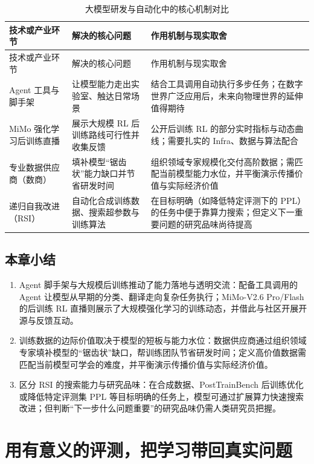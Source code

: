 \documentclass[UTF8,a4paper,11pt,fontset=fandol]{ctexart}
\begin{document}
\begin{longtable}{>{\raggedright\arraybackslash}p{\dimexpr(\linewidth-6\tabcolsep)/3\relax}>{\raggedright\arraybackslash}p{\dimexpr(\linewidth-6\tabcolsep)/3\relax}>{\raggedright\arraybackslash}p{\dimexpr(\linewidth-6\tabcolsep)/3\relax}}
\caption{大模型研发与自动化中的核心机制对比}\\
\toprule
技术或产业环节 & 解决的核心问题 & 作用机制与现实取舍\\\midrule
\endfirsthead
\toprule
技术或产业环节 & 解决的核心问题 & 作用机制与现实取舍\\\midrule
\endhead
Agent 工具与脚手架 & 让模型能力走出实验室、触达日常场景 & 结合工具调用自动执行多步任务；在数字世界广泛应用后，未来向物理世界的延伸值得期待\\[4pt]
MiMo 强化学习后训练直播 & 展示大规模 RL 后训练路线可行性并收集反馈 & 公开后训练 RL 的部分实时指标与动态曲线；需要扎实的 Infra、数据与算法配合\\[4pt]
专业数据供应商（数商） & 填补模型“锯齿状”能力缺口并节省研发时间 & 组织领域专家规模化交付高阶数据；需匹配当前模型能力水位，并平衡演示传播价值与实际经济价值\\[4pt]
递归自我改进（RSI） & 自动化合成训练数据、搜索超参数与训练算法 & 在目标明确（如降低特定评测下的 PPL）的任务中便于靠算力搜索；但定义下一重要问题的研究品味尚待提高\\[4pt]
\bottomrule\end{longtable}\endgroup
{}\subsection{本章小结}
\begin{enumerate}
\item Agent 脚手架与大规模后训练推动了能力落地与透明交流：配备工具调用的 Agent 让模型从早期的分类、翻译走向复杂任务执行；MiMo-V2.6 Pro/Flash 的后训练 RL 直播则展示了大规模强化学习的训练动态，并借此与社区开展开源与反馈互动。
\item 训练数据的边际价值取决于模型的短板与能力水位：数据供应商通过组织领域专家填补模型的“锯齿状”缺口，帮训练团队节省研发时间；定义高价值数据需匹配当前模型可学会的难度，并平衡演示传播价值与实际经济价值。
\item 区分 RSI 的搜索能力与研究品味：在合成数据、PostTrainBench 后训练优化或降低特定评测集 PPL 等目标明确的任务上，模型可通过扩展算力快速搜索改进；但判断“下一步什么问题重要”的研究品味仍需人类研究员把握。
\end{enumerate}
\section{用有意义的评测，把学习带回真实问题}
\end{document}
